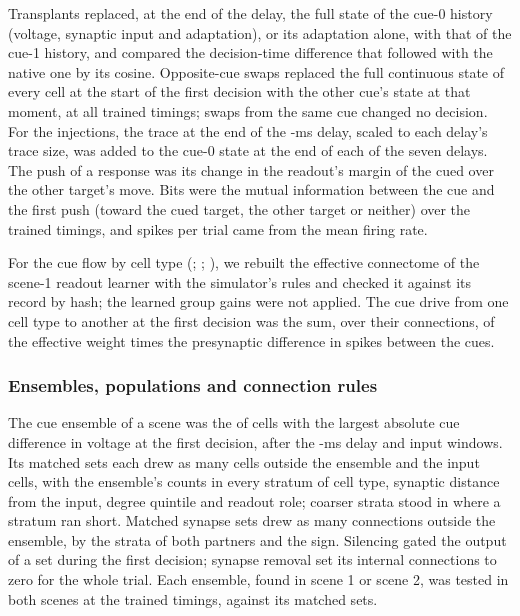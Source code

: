 Transplants replaced, at the end of the delay, the full state of the cue-0 history (voltage, synaptic input and adaptation),
or its adaptation alone, with that of the cue-1 history, and compared the decision-time difference that followed with the native one by its cosine. Opposite-cue swaps
replaced the full continuous state of every cell at the start of the first decision with the other cue's state at that
moment, at all  trained timings; swaps from the same cue changed no decision. For the injections, the trace at the end
of the -ms delay, scaled to each delay's trace size, was added to the cue-0 state at the end of each of the seven
delays. The push of a response was its change in the readout's margin of the cued over the other target's move. Bits were
the mutual information between the cue and the first push (toward the cued target, the other target or neither) over the
trained timings, and spikes per trial came from the mean firing rate.

For the cue flow by cell type (; ; ), we rebuilt the effective connectome of the scene-1 readout
learner with the simulator's rules and checked it against its record by hash; the learned group gains were not applied. The
cue drive from one cell type to another at the first decision was the sum, over their connections, of the effective weight
times the presynaptic difference in spikes between the cues.

\subsubsection{Ensembles, populations and connection rules}

The cue ensemble of a scene was the  of cells with the largest absolute cue difference in voltage at the first
decision, after the -ms delay and  input windows. Its  matched sets each drew as many cells outside
the ensemble and the input cells, with the ensemble's counts in every stratum of cell type, synaptic distance from the input,
degree quintile and readout role; coarser strata stood in where a stratum ran short. Matched synapse sets drew as many
connections outside the ensemble, by the strata of both partners and the sign. Silencing gated the output of a set during the
first decision; synapse removal set its internal connections to zero for the whole trial. Each ensemble, found in scene 1 or
scene 2, was tested in both scenes at the trained timings, against its matched sets.

